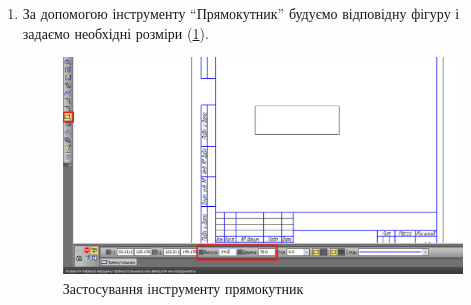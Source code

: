 \begin{enumerate}[leftmargin=*]
\item За допомогою інструменту ``Прямокутник'' будуємо відповідну фігуру і задаємо необхідні розміри
  (\ref{fig:lab3:rectangle}).
  \begin{figure}[!ht]
    \centering \includegraphics[width=0.9\linewidth]{./images/lab3/step1.png}
    \caption{Застосування інструменту прямокутник}
    \label{fig:lab3:rectangle} 
  \end{figure}


\end{enumerate}
